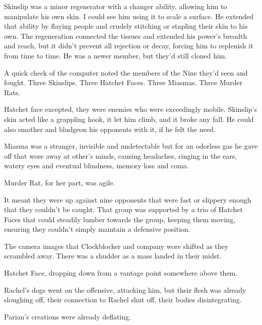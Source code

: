 Skinslip was a minor regenerator with a changer ability, allowing him to manipulate his own skin.  I could see him using it to scale a surface.  He extended that ability by flaying people and crudely stitching or stapling their skin to his own.  The regeneration connected the tissues and extended his power's breadth and reach, but it didn't prevent all rejection or decay, forcing him to replenish it from time to time.  He was a newer member, but they'd still cloned him.



A quick check of the computer noted the members of the Nine they'd seen and fought.  Three Skinslips.  Three Hatchet Faces.  Three Miasmas.  Three Murder Rats.



Hatchet face excepted, they were enemies who were exceedingly mobile.  Skinslip's skin acted like a grappling hook, it let him climb, and it broke any fall.  He could also smother and bludgeon his opponents with it, if he felt the need.



Miasma was a stranger, invisible and undetectable but for an odorless gas he gave off that wore away at other's minds, causing headaches, ringing in the ears, watery eyes and eventual blindness, memory loss and coma.



Murder Rat, for her part, was agile.



It meant they were up against nine opponents that were fast or slippery enough that they couldn't be caught.  That group was supported by a trio of Hatchet Faces that could steadily lumber towards the group, keeping them moving, ensuring they couldn't simply maintain a defensive position.



The camera images that Clockblocker and company wore shifted as they scrambled away.  There was a shudder as a mass landed in their midst.



Hatchet Face, dropping down from a vantage point somewhere above them.



Rachel's dogs went on the offensive, attacking him, but their flesh was already sloughing off, their connection to Rachel shut off, their bodies disintegrating.



Parian's creations were already deflating.



